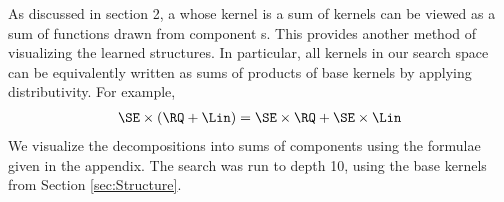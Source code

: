 As discussed in section 2, a \gp{} whose kernel is a sum of kernels can be viewed as a sum of functions drawn from component \gp{}s.
This provides another method of visualizing the learned structures.
In particular, all kernels in our search space can be equivalently written as sums of products of base kernels by applying distributivity. For example,
%
\begin{align}
\SE \times (\RQ + \Lin) = \SE \times \RQ + \SE \times \Lin
\end{align}
%
We visualize the decompositions into sums of components using the formulae given in the appendix.
%
%
%
%
%
The search was run to depth 10, using the base kernels from Section \ref{sec:Structure}.



